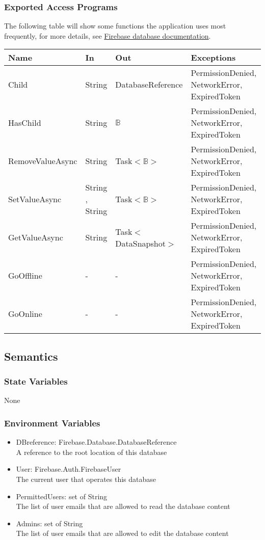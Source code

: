 \documentclass[12pt, titlepage]{article}
\begin{document}
\begin{itemize}
\subsubsection{Exported Access Programs}
The following table will show some functions the application uses most frequently, for more details, see \href{https://firebase.google.com/docs/reference/unity/namespace/firebase/database}{Firebase database documentation}.
\begin{center}
\begin{tabular}{p{4cm} p{2cm} p{4cm} p{4cm}}
\hline
\textbf{Name} & \textbf{In} & \textbf{Out} & \textbf{Exceptions} \\
\hline
Child & String & DatabaseReference & PermissionDenied, NetworkError, ExpiredToken \\
HasChild & String & $\mathbb{B}$ & PermissionDenied, NetworkError, ExpiredToken \\
RemoveValueAsync & String & Task$<\mathbb{B}>$ & PermissionDenied,  NetworkError,  ExpiredToken \\
SetValueAsync & String , String & Task$<\mathbb{B}>$ & PermissionDenied,  NetworkError,  ExpiredToken \\
GetValueAsync & String & Task$<$DataSnapshot$>$ & PermissionDenied, NetworkError,  ExpiredToken \\
GoOffline & - & - & PermissionDenied, NetworkError,  ExpiredToken \\
GoOnline & - & - & PermissionDenied, NetworkError,  ExpiredToken \\
\hline
\end{tabular}
\end{center}

\subsection{Semantics}

\subsubsection{State Variables}

None

\subsubsection{Environment Variables}

\begin{itemize}
\item DBreference: Firebase.Database.DatabaseReference\\
A reference to the root location of this database
\item User: Firebase.Auth.FirebaseUser\\
The current user that operates this database
\item PermittedUsers: set of String\\
The list of user emails that are allowed to read the database content
\item Admins: set of String\\
The list of user emails that are allowed to edit the database content
\end{itemize}



\end{itemize}
\end{document}
